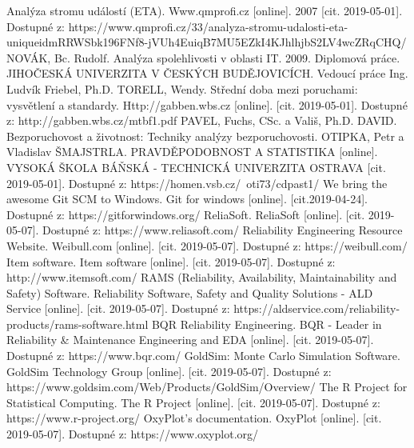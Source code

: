 \documentclass[FM,RP]{tulthesis}
\begin{document}
\begin{thebibliography}{Mm99}
        Analýza stromu událostí (ETA). Www.qmprofi.cz [online]. 2007 [cit. 2019-05-01]. Dostupné z: https://www.qmprofi.cz/33/analyza-stromu-udalosti-eta-uniqueidmRRWSbk196FNf8-jVUh4EuiqB7MU5EZkI4KJhlhjbS2LV4wcZRqCHQ/
        NOVÁK, Bc. Rudolf. Analýza spolehlivosti v oblasti IT. 2009. Diplomová práce. JIHOČESKÁ UNIVERZITA V ČESKÝCH BUDĚJOVICÍCH. Vedoucí práce Ing. Ludvík Friebel, Ph.D.
        TORELL, Wendy. Střední doba mezi poruchami: vysvětlení a standardy. Http://gabben.wbs.cz [online]. [cit. 2019-05-01]. Dostupné z: http://gabben.wbs.cz/mtbf1.pdf
        PAVEL, Fuchs, CSc. a Vališ, Ph.D. DAVID. Bezporuchovost a životnost: Techniky analýzy bezporuchovosti.
        OTIPKA, Petr a Vladislav ŠMAJSTRLA. PRAVDĚPODOBNOST A STATISTIKA [online]. VYSOKÁ ŠKOLA BÁŇSKÁ - TECHNICKÁ UNIVERZITA OSTRAVA [cit. 2019-05-01]. Dostupné z: https://homen.vsb.cz/~oti73/cdpast1/
        We bring the awesome Git SCM to Windows. Git for windows [online]. [cit.2019-04-24]. Dostupné z: https://gitforwindows.org/
        ReliaSoft. ReliaSoft [online]. [cit. 2019-05-07]. Dostupné z: https://www.reliasoft.com/
        Reliability Engineering Resource Website. Weibull.com [online]. [cit. 2019-05-07]. Dostupné z: https://weibull.com/
        Item software. Item software [online]. [cit. 2019-05-07]. Dostupné z: http://www.itemsoft.com/
        RAMS (Reliability, Availability, Maintainability and Safety) Software. Reliability Software, Safety and Quality Solutions - ALD Service [online]. [cit. 2019-05-07]. Dostupné z: https://aldservice.com/reliability-products/rams-software.html
        BQR Reliability Engineering. BQR - Leader in Reliability \& Maintenance Engineering and EDA [online]. [cit. 2019-05-07]. Dostupné z: https://www.bqr.com/
        GoldSim: Monte Carlo Simulation Software. GoldSim Technology Group [online]. [cit. 2019-05-07]. Dostupné z: https://www.goldsim.com/Web/Products/GoldSim/Overview/
        The R Project for Statistical Computing. The R Project [online]. [cit. 2019-05-07]. Dostupné z: https://www.r-project.org/
        OxyPlot’s documentation. OxyPlot [online]. [cit. 2019-05-07]. Dostupné z: https://www.oxyplot.org/
\end{thebibliography}
\end{document}

